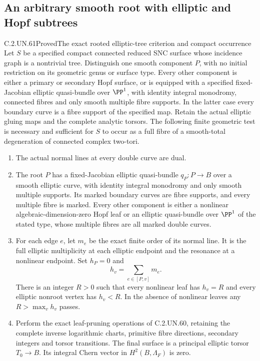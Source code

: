 \subsection{An arbitrary smooth root with elliptic and Hopf subtrees}

\begin{statement}{C.2.UN.61}{Proved}{The exact rooted elliptic-tree criterion and compact occurrence}
Let $S$ be a specified compact connected reduced SNC surface whose
incidence graph is a nontrivial tree. Distinguish one smooth component
$P$, with no initial restriction on its geometric genus or surface
type. Every other component is either a primary or secondary Hopf
surface, or is equipped with a specified fixed-Jacobian elliptic
quasi-bundle over $\PP^1$, with identity integral monodromy,
connected fibres and only smooth multiple fibre supports.
In the latter case every boundary curve is a fibre support of
the specified map. Retain the actual elliptic gluing maps
and the complete analytic torsors. The following finite
geometric test is necessary and sufficient for $S$ to occur
as a full fibre of a smooth-total degeneration of connected complex
two-tori.

\begin{enumerate}
\item The actual normal lines at every double curve are dual.
\item The root $P$ has a fixed-Jacobian elliptic quasi-bundle
$q_P:P\to B$ over a smooth elliptic curve, with identity integral
monodromy and only smooth multiple supports. Its marked boundary
curves are fibre supports, and every multiple fibre is marked.
Every other component is either a nonlinear algebraic-dimension-zero
Hopf leaf or an elliptic quasi-bundle over $\PP^1$ of the stated
type, whose multiple fibres are all marked double curves.
\item For each edge $e$, let $m_e$ be the exact finite order of
its normal line. It is the full elliptic multiplicity at each
elliptic endpoint and the resonance at a nonlinear endpoint.
Set $h_P=0$ and
\[
                  h_v=\sum_{e\in[P,v]}m_e.
                  \tag{C.PT.1}
\]
There is an integer $R>0$ such that every nonlinear leaf has
$h_v=R$ and every elliptic nonroot vertex has $h_v<R$.
In the absence of nonlinear leaves any $R>\max_vh_v$ passes.
\item Perform the exact leaf-pruning operations of C.2.UN.60,
retaining the complete inverse logarithmic charts, primitive fibre
directions, secondary integers and torsor transitions. The final
surface is a principal elliptic torsor $T_0\to B$. Its integral
Chern vector in $H^2(B,\Lambda_F)$ is zero.
\end{enumerate}


\end{statement}
